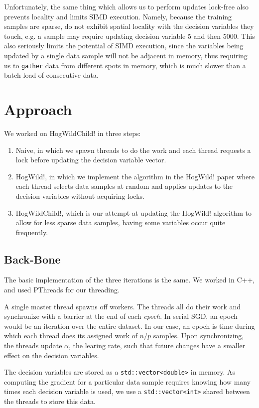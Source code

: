 \documentclass{article}
\begin{document}
Unfortunately, the same thing which allows us to perform updates lock-free
also prevents locality and limits SIMD execution.
Namely, because the training samples are sparse, do not exhibit
spatial locality with the decision variables they touch,
e.g. a sample may require updating decision variable 5 and then 5000.
This also seriously limits the potential of SIMD execution,
since the variables being updated by a single data sample will not be
adjacent in memory, thus requiring us to \texttt{gather} data from
different spots in memory, which is much slower than a batch load of
consecutive data.

\section{Approach}

We worked on HogWildChild! in three steps:
\begin{enumerate}
\item  Naive, in which we spawn threads to do the work and each thread
       requests a lock before updating the decision variable vector.
\item  HogWild!, in which we implement the algorithm in the HogWild! paper
       where each thread selects data samples at random and applies updates
       to the decision variables without acquiring locks.
\item  HogWildChild!, which is our attempt at updating the HogWild!
       algorithm to allow for less sparse data samples, having some
       variables occur quite frequently.
\end{enumerate}

\subsection{Back-Bone}

The basic implementation of the three iterations is the same.
We worked in C++, and used PThreads for our threading.

A single master thread spawns off workers.
The threads all do their work and synchronize with a barrier at the end
of each \emph{epoch}.
In serial SGD, an epoch would be an iteration over the entire
dataset.
In our case, an epoch is time during which each thread does its assigned
work of $n / p$ samples.
Upon synchronizing, the threads update $\alpha$, the learing rate,
such that future changes have a smaller effect on the decision variables.

The decision variables are stored as a \texttt{std::vector<double>}
in memory.
As computing the gradient for a particular data sample requires knowing
how many times each decision variable is used, we use a
\texttt{std::vector<int>} shared between the threads to store this data.
\end{document}
